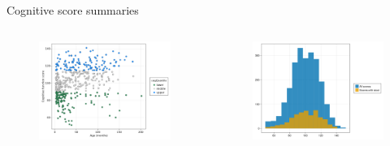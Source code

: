 
\begin{frame}{Cognitive score summaries}
    \begin{columns}[c] %

        
        \begin{figure}
            \includegraphics[width=1\linewidth]{../figures/cogScore_quartiles.png}
        \end{figure}

    
        \begin{figure}
        \includegraphics[width=1\linewidth]{../figures/cogscores_hist.png}
        \end{figure}


\end{columns}
\end{frame}
